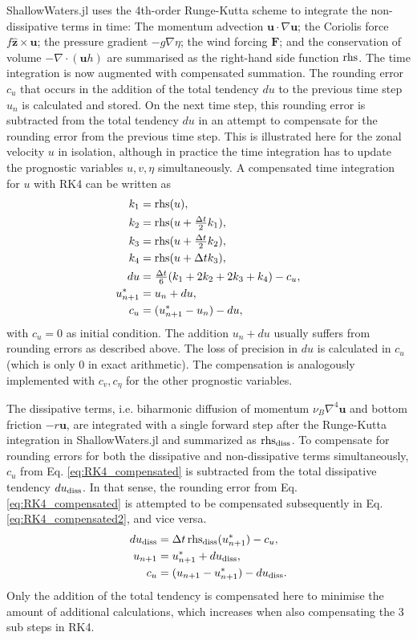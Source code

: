 ShallowWaters.jl uses the 4th-order Runge-Kutta scheme \citep{Butcher2008} to integrate the non-dissipative terms in time:
The momentum advection $\mathbf{u} \cdot \nabla \mathbf{u}$;
the Coriolis force $f\mathbf{\hat{z}} \times \mathbf{u}$;
the pressure gradient $-g\nabla \eta$;
the wind forcing $\mathbf{F}$;
and the conservation of volume $-\nabla \cdot (\mathbf{u} h)$ are summarised as the right-hand side function $\operatorname{rhs}$.
The time integration is now augmented with compensated summation. The rounding error $c_u$ that occurs in the addition
of the total tendency $du$ to the previous time step $u_n$ is calculated and stored. On the next time step, this rounding error
is subtracted from the total tendency $du$ in an attempt to compensate for the rounding error from the previous time step.
This is illustrated here for the zonal velocity $u$ in isolation, although in practice the time integration has to update the
prognostic variables $u,v,\eta$ simultaneously. A compensated time integration for $u$ with RK4 can be written as
\begin{align}
k_1 &= \operatorname{rhs}(u), \nonumber \\
k_2 &= \operatorname{rhs}(u + \tfrac{\Delta t}{2}k_1), \nonumber \\
k_3 &= \operatorname{rhs}(u + \tfrac{\Delta t}{2}k_2), \nonumber \\
k_4 &= \operatorname{rhs}(u + \Delta t k_3), \nonumber \\
du &= \tfrac{\Delta t}{6}(k_1 + 2k_2 + 2k_3 + k_4) - c_u, \nonumber \\
u_{n+1}^* &= u_n + du, \nonumber \\
c_u &= (u^*_{n+1} - u_n) - du,
\label{eq:RK4_compensated}
\end{align}
with $c_u = 0$ as initial condition. The addition $u_n + du$ usually suffers from rounding errors as described above.
The loss of precision in $du$ is calculated in $c_u$ (which is only 0 in exact arithmetic). The compensation is analogously
implemented with $c_v,c_\eta$  for the other prognostic variables.  

The dissipative terms, i.e. biharmonic diffusion of momentum $\nu_B\nabla^4\mathbf{u}$ and bottom friction $-r\mathbf{u}$,
are integrated with a single forward step after the Runge-Kutta integration in ShallowWaters.jl and summarized as 
$\operatorname{rhs}_{\operatorname{diss}}$. To compensate for rounding errors for both the dissipative and non-dissipative terms simultaneously,
$c_u$ from Eq. \ref{eq:RK4_compensated} is subtracted from the total dissipative tendency $du_{\operatorname{diss}}$.
In that sense, the rounding error from Eq. \ref{eq:RK4_compensated} is attempted to be compensated subsequently
in Eq. \ref{eq:RK4_compensated2}, and vice versa.
\begin{align}
du_{\operatorname{diss}} &= \Delta t \operatorname{rhs}_{\operatorname{diss}}(u_{n+1}^*) - c_u, \nonumber \\
u_{n+1} &= u^*_{n+1} + du_{\operatorname{diss}}, \nonumber \\
c_u &= (u_{n+1} - u_{n+1}^*) - du_{\operatorname{diss}}.
\label{eq:RK4_compensated2}
\end{align}
Only the addition of the total tendency is compensated here to minimise the amount of additional calculations, which
increases when also compensating the 3 sub steps in RK4.

